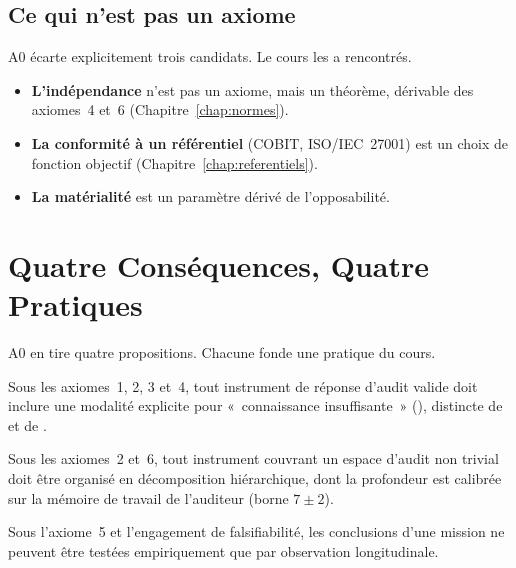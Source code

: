 \subsection{Ce qui n'est pas un axiome}

A0 écarte explicitement trois candidats. Le cours les a rencontrés.
\begin{itemize}
    \item \textbf{L'indépendance} n'est pas un axiome, mais un théorème,
          dérivable des axiomes~4 et~6 (Chapitre~\ref{chap:normes}).
    \item \textbf{La conformité à un référentiel} (COBIT, ISO/IEC~27001) est
          un choix de fonction objectif (Chapitre~\ref{chap:referentiels}).
    \item \textbf{La matérialité} est un paramètre dérivé de l'opposabilité.
\end{itemize}

\section{Quatre Conséquences, Quatre Pratiques}
\label{sec:c30-propositions}

A0 en tire quatre propositions. Chacune fonde une pratique du cours.

\begin{proposition}
Sous les axiomes~1, 2, 3 et~4, tout instrument de réponse d'audit valide
doit inclure une modalité explicite pour «~connaissance insuffisante~»
(\NEK{}), distincte de \OUI{} et de \NON{}.
\end{proposition}

\begin{proposition}
Sous les axiomes~2 et~6, tout instrument couvrant un espace d'audit non
trivial doit être organisé en décomposition hiérarchique, dont la
profondeur est calibrée sur la mémoire de travail de l'auditeur (borne
$7 \pm 2$).
\end{proposition}

\begin{proposition}
Sous l'axiome~5 et l'engagement de falsifiabilité, les conclusions d'une
mission ne peuvent être testées empiriquement que par observation
longitudinale.
\end{proposition}

